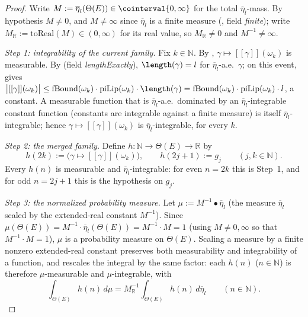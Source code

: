 \begin{proof}
  Write $M := \overline\eta_l(\Theta(E)) \in \cointerval{0,\infty}$ for the total
  $\overline\eta_l$-mass. By hypothesis $M \ne 0$, and $M \ne \infty$ since $\overline\eta_l$ is a
  finite measure (, field \emph{finite}); write $M_{\mathbb R} :=
  \mathrm{toReal}(M) \in (0,\infty)$ for its real value, so $M_{\mathbb R} \ne 0$ and
  $M^{-1} \ne \infty$.

  \emph{Step 1: integrability of the current family.} Fix $k \in \mathbb{N}$. By
  , $\gamma \mapsto [[\gamma]](\omega_k)$ is measurable. By
   (field \emph{lengthExactly}), $\length(\gamma) = l$ for $\overline\eta_l$-a.e.\
  $\gamma$; on this event,  gives
  $\bigl|[[\gamma]](\omega_k)\bigr| \le \mathrm{fBound}(\omega_k)\cdot\mathrm{piLip}(\omega_k)\cdot
  \length(\gamma) = \mathrm{fBound}(\omega_k)\cdot\mathrm{piLip}(\omega_k)\cdot l$, a constant.
  A measurable function that is $\overline\eta_l$-a.e.\ dominated by an $\overline\eta_l$-integrable
  constant function (constants are integrable against a finite measure) is itself
  $\overline\eta_l$-integrable; hence $\gamma \mapsto [[\gamma]](\omega_k)$ is
  $\overline\eta_l$-integrable, for every $k$.

  \emph{Step 2: the merged family.} Define $h \colon \mathbb{N} \to \Theta(E) \to \mathbb{R}$ by
  \[
    h(2k) := \bigl(\gamma \mapsto [[\gamma]](\omega_k)\bigr)
    ,\qquad
    h(2j+1) := g_j
    \qquad (j,k \in \mathbb{N})
    .
  \]
  Every $h(n)$ is measurable and $\overline\eta_l$-integrable: for even $n=2k$ this is Step~1, and
  for odd $n=2j+1$ this is the hypothesis on $g_j$.

  \emph{Step 3: the normalized probability measure.} Let $\mu := M^{-1} \bullet \overline\eta_l$
  (the measure $\overline\eta_l$ scaled by the extended-real constant $M^{-1}$). Since
  $\mu(\Theta(E)) = M^{-1}\cdot\overline\eta_l(\Theta(E)) = M^{-1}\cdot M = 1$ (using $M \ne 0,\infty$
  so that $M^{-1}\cdot M = 1$), $\mu$ is a probability measure on $\Theta(E)$. Scaling a measure by
  a finite nonzero extended-real constant preserves both measurability and integrability of a
  function, and rescales the integral by the same factor: each $h(n)$ ($n \in \mathbb{N}$) is
  therefore $\mu$-measurable and $\mu$-integrable, with
  \[
    \int_{\Theta(E)} h(n) \, d\mu = M_{\mathbb R}^{-1} \int_{\Theta(E)} h(n) \, d\overline\eta_l
    \qquad (n \in \mathbb{N})
    . \tag{$\ast$}
  \]


\end{proof}
